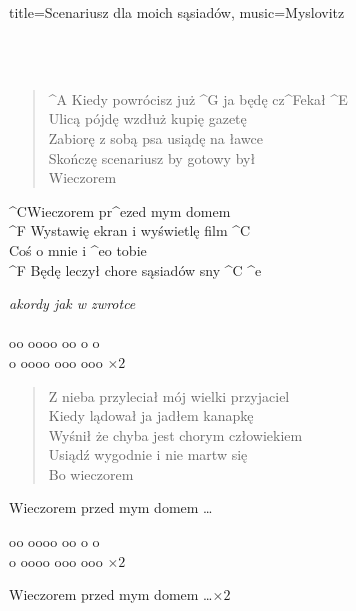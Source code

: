 \newpage
\small
\begin{song}{title={Scenariusz dla moich sąsiadów}, music={Myslovitz}} 
    \begin{intro}
    	 \\
    	   \\
    \end{intro}
  	\begin{verse}
	  	^{A} Kiedy powrócisz już ^{G} ja będę cz^{F}ekał ^{E} \\
		Ulicą pójdę wzdłuż kupię gazetę \\
		Zabiorę z sobą psa usiądę na ławce \\
		Skończę scenariusz by gotowy był \\
		Wieczorem
	\end{verse}
	\begin{chorus}		
		^{C}Wieczorem pr^{e}zed mym domem \\
		^{F} Wystawię ekran i wyświetlę film ^{C} \\
		Coś o mnie i ^{e}o tobie \\
		^{F} Będę leczył chore sąsiadów sny ^{C} ^{e}
	\end{chorus}
	\begin{interlude}
		\textit{akordy jak w zwrotce} \\ \\
		oo oooo oo o o \\
		o oooo ooo ooo $\times 2$
	\end{interlude}
	\begin{verse}
		Z nieba przyleciał mój wielki przyjaciel \\
		Kiedy lądował ja jadłem kanapkę \\
		Wyśnił że chyba jest chorym człowiekiem \\
		Usiądź wygodnie i nie martw się \\
		Bo wieczorem
	\end{verse}
	\begin{chorus} 
		Wieczorem przed mym domem  \ldots
  	\end{chorus}
 	\begin{interlude}
		oo oooo oo o o \\
		o oooo ooo ooo $\times 2$
	\end{interlude}
	\begin{chorus} 
		Wieczorem przed mym domem  \ldots $\times 2$
  	\end{chorus}
\end{song}

